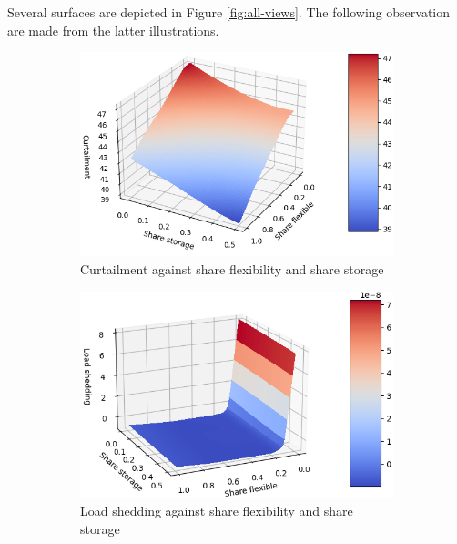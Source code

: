 Several surfaces are depicted in Figure \ref{fig:all-views}. The following observation are made from the latter illustrations.

\begin{figure}[h]
    \centering
    \begin{subfigure}[b]{0.49\textwidth}
        \includegraphics[width=\textwidth]{resources/images/view_1-2-0.png}
        \caption{Curtailment against share flexibility and share storage}
        \label{fig:surf-1-2-0}
    \end{subfigure}
    \hfill
    \begin{subfigure}[b]{0.49\textwidth}
        \includegraphics[width=\textwidth]{resources/images/view_1-2-1.png}
        \caption{Load shedding against share flexibility and share storage}
        \label{fig:surf-1-2-1}
    \end{subfigure}
    \hfill
    \begin{subfigure}[b]{0.49\textwidth}

\end{subfigure}
\end{figure}
